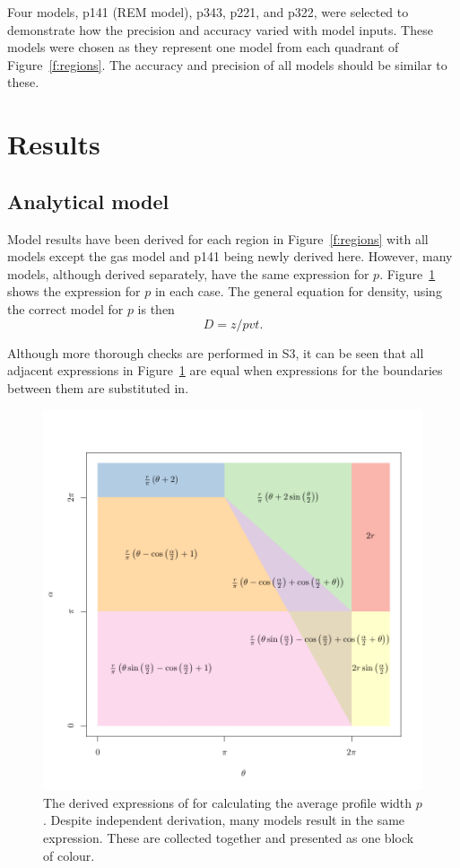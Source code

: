 \documentclass[a4paper,10pt,reqno,oneside]{amsart}
\begin{document}
Four models, p141 (REM model), p343, p221, and p322, were selected to demonstrate how the precision and accuracy varied with model inputs. These models were chosen as they represent one model from each quadrant of Figure~\ref{f:regions}. The accuracy and precision of all models should be similar to these.


\section{Results}

\subsection{Analytical model}

Model results have been derived for each region in Figure~\ref{f:regions} with all models except the gas model and p141 being newly derived here. However, many models, although derived separately, have the same expression for $p$. Figure~\ref{f:equalModelResults} shows the expression for $p$ in each case. The general equation for density, using the correct model for $p$ is then
\begin{equation}
\label{e:D}
	D = z/pvt.
\end{equation}

Although more thorough checks are performed in S3, it can be seen that all adjacent expressions in Figure~\ref{f:equalModelResults} are equal when expressions for the boundaries between them are substituted in.


\begin{figure}
\centering
\includegraphics[width=1\textwidth]{imgs/equalModelResults.pdf}
\caption{The derived expressions of for calculating the average profile width $p$. Despite independent derivation, many models result in the same expression. These are collected together and presented as one block of colour.}
\label{f:equalModelResults}
\end{figure}
\end{document}
